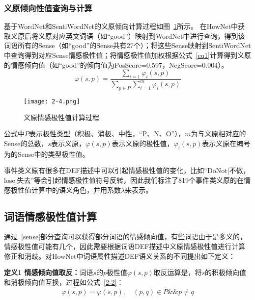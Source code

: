 \subsubsection{义原倾向性值查询与计算}
基于WordNet和SentiWordNet的义原倾向计算过程如图~\ref{atomsen}所示。
在HowNet中获取义原后将义原对应英文词语（如“good”）映射到WordNet中进行查询，得到该词语所有的Sense（如“good”的Sense共有27个）；将这些Sense映射到SentiWordNet中查询得到对应Sense情感极性值；将情感极性值加权根据公式~\ref{eq1}计算得到义原的情感倾向值（如“good”的倾向值为PosScore=0.597，NegScore=0.004）。
\begin{equation}
\label{eq1}
\varphi(s,p)=\dfrac{\sum_{i=1} \varphi_i (s,p)}{\sum_{p\in P}\sum_{i=1}^m \varphi_i(s,p)}
\end{equation}

\begin{figure}[htp]
\centering
\texttt{[image: 2-4.png]}
\caption{义原情感极性值计算过程}
\label{atomsen}
\end{figure}

公式中$ P$表示极性类型（积极、消极、中性，“P、N、O”），$m$为与义原相对应的Sense的总数，$s$表示义原，$\varphi(s,p)$表示义原的极性值，$\varphi_i (s,p)$表示义原在编号为的Sense中的类型极性值。

事件类义原有很多在DEF描述中可以引起情感极性值的变化，比如“DoNot|不做，lose|失去”等会引起情感极性值符号反转，因此我们标注了819个事件类义原的在情感极性值计算中的语义角色，并用系数$\lambda$来表示。

\subsection{词语情感极性值计算}
通过~\ref{sense}部分查询可以获得部分词语的情感倾向值，有些词语由于是多义的，情感极性值可能有几个，因此需要根据词语DEF描述中义原情感极性值进行计算修正和消歧。对HowNet中词语属性描述DEF语义关系的不同提出如下定义：

\textbf{定义1 情感倾向值取反：}词语$s$的$p$极性值$\varphi(s,p)$取反运算是，将$s$的积极倾向值和消极倾向值互换，过程如公式~\ref{2-2}：
\begin{equation}
\label{2-2}
\overline{\varphi(s,p)}=\varphi(s,p),\quad (p,q) \in P\&\& p \neq q
\end{equation}

